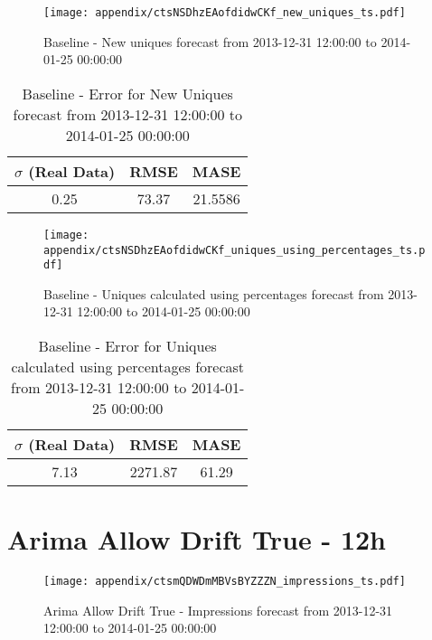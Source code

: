 \begin{figure}[H] \begin{center} \leavevmode
\texttt{[image: appendix/ctsNSDhzEAofdidwCKf\_new\_uniques\_ts.pdf]} \caption[]{
Baseline - New uniques forecast from 2013-12-31 12:00:00 to 2014-01-25 00:00:00} \label{fig:appendix/ctsNSDhzEAofdidwCKf_new_uniques_ts.pdf} \end{center}
\end{figure}

\begin{table}[H]
\centering
\footnotesize
\begin{tabular}{ccc}
$\sigma$ (Real Data) & RMSE & MASE   \\ \hline
0.25 & 73.37 & 21.5586 \\
\end{tabular}

\vspace{0.5cm}

\caption[]{
Baseline - Error for New Uniques forecast from 2013-12-31 12:00:00 to 2014-01-25 00:00:00}
\end{table}

\begin{figure}[H] \begin{center} \leavevmode
\texttt{[image: appendix/ctsNSDhzEAofdidwCKf\_uniques\_using\_percentages\_ts.pdf]} \caption[]{
Baseline - Uniques calculated using percentages forecast from 2013-12-31 12:00:00 to 2014-01-25 00:00:00} \label{fig:appendix/ctsNSDhzEAofdidwCKf_uniques_using_percentages_ts.pdf} \end{center}
\end{figure}

\begin{table}[H]
\centering
\footnotesize
\begin{tabular}{ccc}
$\sigma$ (Real Data) & RMSE & MASE   \\ \hline
7.13 & 2271.87 & 61.29 \\
\end{tabular}

\vspace{0.5cm}

\caption[]{
Baseline - Error for Uniques calculated using percentages forecast from 2013-12-31 12:00:00 to 2014-01-25 00:00:00}
\end{table}

\section{Arima Allow Drift True - 12h}
\begin{figure}[H] \begin{center} \leavevmode
\texttt{[image: appendix/ctsmQDWDmMBVsBYZZZN\_impressions\_ts.pdf]} \caption[]{
Arima Allow Drift True - Impressions forecast from 2013-12-31 12:00:00 to 2014-01-25 00:00:00} \label{fig:appendix/ctsmQDWDmMBVsBYZZZN_impressions_ts.pdf} \end{center}
\end{figure}

